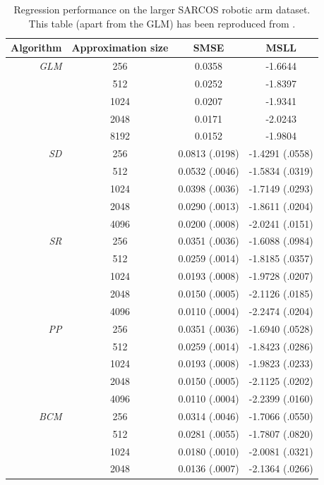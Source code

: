 \documentclass[11pt, oneside]{article}
\begin{document}
\begin{table}[tb]

    \centering
    \caption{Regression performance on the larger SARCOS robotic arm dataset.
        This table (apart from the GLM) has been reproduced from
        \citet{Rasmussen2006}.}
    \label{tab:sarcos}
    \begin{tabular}{r|c|c c}
        \textbf{Algorithm} & \textbf{Approximation size} & \textbf{SMSE} &
        \textbf{MSLL} \\
        \hline
        \emph{GLM} & 256 & 0.0358 & -1.6644 \\
        & 512 & 0.0252 & -1.8397 \\
        & 1024 & 0.0207 & -1.9341 \\
        & 2048 & 0.0171 & -2.0243 \\
        & 8192 & 0.0152 & -1.9804 \\
        \hline
        \emph{SD} & 256 & 0.0813 (.0198) & -1.4291 (.0558) \\
        & 512 & 0.0532 (.0046) & -1.5834 (.0319) \\
        & 1024 & 0.0398 (.0036) & -1.7149 (.0293) \\
        & 2048 & 0.0290 (.0013) & -1.8611 (.0204) \\
        & 4096 & 0.0200 (.0008) & -2.0241 (.0151)\\
        \hline
        \emph{SR} & 256 & 0.0351 (.0036) & -1.6088 (.0984) \\
        & 512 &  0.0259 (.0014) & -1.8185 (.0357) \\
        & 1024 & 0.0193 (.0008) & -1.9728 (.0207) \\
        & 2048 & 0.0150 (.0005) & -2.1126 (.0185) \\
        & 4096 & 0.0110 (.0004) & -2.2474 (.0204) \\
        \hline
        \emph{PP} & 256 & 0.0351 (.0036) & -1.6940 (.0528) \\
        & 512 & 0.0259 (.0014) & -1.8423 (.0286) \\
        & 1024 & 0.0193 (.0008) & -1.9823 (.0233) \\
        & 2048 & 0.0150 (.0005) & -2.1125 (.0202) \\
        & 4096 & 0.0110 (.0004) & -2.2399 (.0160) \\
        \hline
        \emph{BCM} & 256 & 0.0314 (.0046) & -1.7066 (.0550) \\
        & 512 & 0.0281 (.0055) & -1.7807 (.0820) \\
        & 1024 & 0.0180 (.0010) & -2.0081 (.0321) \\
        & 2048 & 0.0136 (.0007) & -2.1364 (.0266) \\
        \hline
    \end{tabular}

\end{table}
\end{document}
